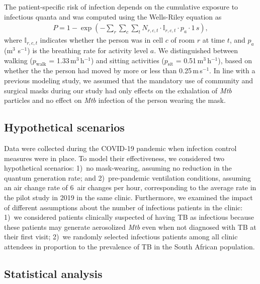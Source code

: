\documentclass[fleqn,11pt]{wlscirep}
\begin{document}
The patient-specific risk of infection depends on the cumulative exposure to infectious quanta and was computed using the Wells-Riley equation as
\begin{align}
    P = 1-\exp\left(-\sum_r \sum_c \sum_t N_{r,c,t} \cdot \mathbb{I}_{r,c,t} \cdot p_a\cdot1\,s\right),
\end{align}
where $\mathbb{I}_{r,c,t}$ indicates whether the person was in cell $c$ of room $r$ at time $t$, and $p_a$ (m$^3$ s$^{-1}$) is the breathing rate for activity level $a$. We distinguished between walking ($p_\mathrm{walk}$ = 1.33\,m$^3$\,h$^{-1}$) and sitting activities ($p_\mathrm{sit}$ = 0.51\,m$^3$\,h$^{-1}$)\cite{Adams1993}, based on whether the the person had moved by more or less than 0.25\,m\,s$^{-1}$. In line with a previous modeling study\cite{McCreesh2021BMJGlobalHealth}, we assumed that the mandatory use of community and surgical masks during our study had only effects on the exhalation of \emph{Mtb} particles and no effect on \emph{Mtb} infection of the person wearing the mask.

\subsection*{Hypothetical scenarios}

Data were collected during the COVID-19 pandemic when infection control measures were in place. To model their effectiveness, we considered two hypothetical scenarios: 1)~no mask-wearing, \ie assuming no reduction in the quantum generation rate; and 2)~pre-pandemic ventilation conditions, \ie assuming an air change rate of 6~air changes per hour, corresponding to the average rate in the pilot study in 2019 in the same clinic\cite{Zurcher2022JID}. Furthermore, we examined the impact of different assumptions about the number of infectious patients in the clinic: 1)~we considered patients clinically suspected of having TB as infectious because these patients may generate aerosolized \emph{Mtb} even when not diagnosed with TB at their first visit\cite{Patterson2024PNAS}; 2)~we randomly selected infectious patients among all clinic attendees in proportion to the prevalence of TB in the South African population\cite{Moyo2022LancetID}. 

\subsection*{Statistical analysis}
\end{document}
